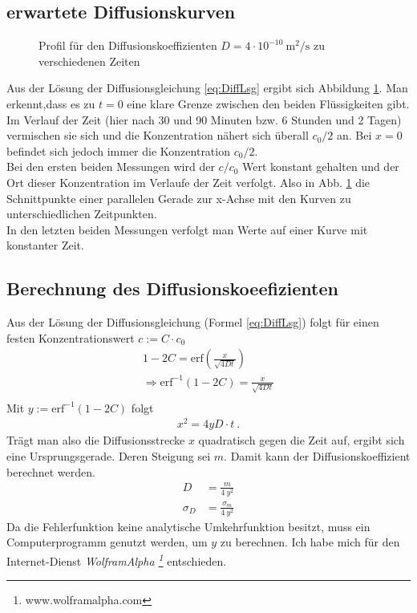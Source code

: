 \documentclass[12pt,a4paper,titlepage,headinclude,bibtotoc]{scrartcl}
\newcommand{\erf}{\ensuremath{\text{erf}}}
\begin{document}
\subsection{erwartete Diffusionskurven}
\begin{figure}
	
	\caption{Profil für den Diffusionskoeffizienten $D=4\cdot 10^{-10} ~ \si{\meter ^2 / \second}$ zu verschiedenen Zeiten}
	\label{fig:erwDiffKurve}
\end{figure}

Aus der Lösung der Diffusionsgleichung \eqref{eq:DiffLsg} ergibt sich Abbildung \ref{fig:erwDiffKurve}.
Man erkennt,dass es zu $t=0$ eine klare Grenze zwischen den beiden Flüssigkeiten gibt.
Im Verlauf der Zeit (hier nach 30 und 90 Minuten bzw. 6 Stunden und 2 Tagen) vermischen sie sich und die Konzentration nähert sich überall $c_0/2$ an.
Bei $x=0$ befindet sich jedoch immer die Konzentration $c_0/2$.\\
Bei den ersten beiden Messungen wird der $c/c_0$ Wert konstant gehalten und der Ort dieser Konzentration im Verlaufe der Zeit verfolgt.
Also in Abb. \ref{fig:erwDiffKurve} die Schnittpunkte einer parallelen Gerade zur x-Achse mit den Kurven zu unterschiedlichen Zeitpunkten.\\
In den letzten beiden Messungen verfolgt man Werte auf einer Kurve mit konstanter Zeit.

\subsection{Berechnung des Diffusionskoeefizienten}
Aus der Lösung der Diffusionsgleichung  (Formel \ref{eq:DiffLsg}) folgt für einen festen Konzentrationswert $c:=C\cdot c_0$
\begin{align*}
	1-2C=\erf\left(\frac{x}{\sqrt{4Dt}}\right)\\
	\Rightarrow \erf^{-1}(1-2C)=\frac{x}{\sqrt{4Dt}}\\
\end{align*}
Mit $y:=\erf^{-1}(1-2C)$ folgt
\begin{align*}
	x^2=4yD\cdot t~.
\end{align*} 
Trägt man also die Diffusionsstrecke $x$ quadratisch gegen die Zeit auf, ergibt sich eine Ursprungsgerade.
Deren Steigung sei $m$.
Damit kann der Diffusionskoeffizient berechnet werden.
\begin{align}
	D&=\frac{m}{4~y^2}\\
	\sigma_D&=\frac{\sigma_m}{4~y^2}
\end{align}
Da die Fehlerfunktion keine analytische Umkehrfunktion besitzt, muss ein Computerprogramm genutzt werden, um $y$ zu berechnen. Ich habe mich für den Internet-Dienst \textsl{WolframAlpha \footnote{www.wolframalpha.com}} entschieden.
\end{document}
